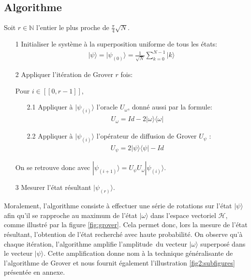 \subsection{Algorithme}
Soit $r\in \mathbb{N}$ l'entier le plus proche de $\frac{\pi}{4} \sqrt{N}$.
\begin{itemize}
	\item[1] Initialiser le système à la superposition uniforme de tous les états:
	\begin{align}
	|\psi \rangle = |\psi_{(0)}\rangle = \frac{1}{\sqrt{N}} \sum_{k=0}^{N-1} |k\rangle
    \label{init}
	\end{align}
	\item[2] Appliquer l'itération de Grover $r$ fois:
	\item[] Pour $i \in [\![0, r-1]\!]$,
	\begin{itemize}
   	 
    	\item[2.1] Appliquer à $|\psi_{(i)}\rangle$ l'oracle $U_{\omega}$, donné aussi par la formule:
    	\begin{align}
    	U_{\omega} = Id -  2|\omega \rangle \langle \omega |
    	\label{Uomega}
    	\end{align}
    	\item[2.2] Appliquer à $|\psi_{(i)}\rangle$ l'opérateur de diffusion de Grover $U_{\psi}$ :
    	\begin{align}
    	U_{\psi} = 2|\psi\rangle \langle \psi | - Id
        \label{Upsi}
    	\end{align}
	\end{itemize}
	\item[] On se retrouve donc avec $|\psi_{(i+1)}\rangle = U_{\psi}U_{\omega} |\psi_{(i)} \rangle$. 
	\item[3] Mesurer l'état résultant $|\psi_{(r)} \rangle$.
\end{itemize}

\noindent Moralement, l'algorithme consiste à effectuer une série de rotations sur l'état $|\psi \rangle $ afin qu'il se rapproche au maximum de l'état $|\omega \rangle $ dans l'espace vectoriel $\mathcal{H}$, comme illustré par la figure \ref{fig:grover}. 
Cela permet donc, lors la mesure de l'état résultant, l'obtention de l'état recherché avec haute probabilité. 
On observe qu'à chaque itération, l'algorithme amplifie l'amplitude\footnotemark \, du vecteur $|\omega\rangle$ superposé dans le vecteur $|\psi\rangle$. Cette amplification donne nom à la technique généralisante de l'algorithme de Grover et nous fournit également l'illustration \ref{fig2:subfigures} présentée en annexe.

